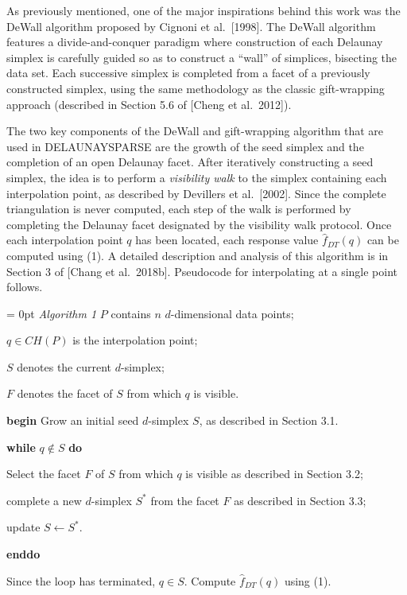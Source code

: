 As previously mentioned, one of the major inspirations behind this
work was the DeWall algorithm proposed by Cignoni et al.\ [1998].
The DeWall algorithm features a divide-and-conquer paradigm where
construction of each Delaunay simplex is carefully guided so as to
construct a ``wall'' of simplices, bisecting the data set. Each
successive simplex is completed from a facet of a previously constructed
simplex, using the same methodology as the classic gift-wrapping
approach (described in Section 5.6 of [Cheng et al.\ 2012]).

The two key components of the DeWall and gift-wrapping algorithm
that are used in DELAUNAYSPARSE are the growth of the seed simplex
and the completion of an open Delaunay facet. After iteratively
constructing a seed simplex, the idea is to perform a 
{\it visibility walk} to the simplex containing each interpolation
point, as described by Devillers et al.\ [2002]. Since the complete
triangulation is never computed, each step of the walk is performed by
completing the Delaunay facet designated by the visibility walk protocol.
Once each interpolation point $q$ has been located, each response value
${\hat f}_{DT}(q)$ can be computed using (1). A detailed description
and analysis of this algorithm is in Section 3 of [Chang et al.\ 2018b].
Pseudocode for interpolating at a single point follows.

{\parindent =0pt \parskip= 0pt
\smallskip
\leftskip 20pt
{\sl Algorithm 1}
\smallskip
$P$ contains $n$ $d$-dimensional data points;\par
$q \in CH(P)$ is the interpolation point;\par
$S$ denotes the current $d$-simplex; \par
$F$ denotes the facet of $S$ from which $q$ is visible. \par
\smallskip
{\bf begin}
Grow an initial seed $d$-simplex $S$, as described in Section 3.1.\par
{\bf while} $q \not\in S$ {\bf do}\par
\leftskip 40pt
Select the facet $F$ of $S$ from which $q$ is visible as
described in Section 3.2;\par
complete a new $d$-simplex $S^*$ from the facet $F$ as described 
in Section 3.3;\par
update $S \leftarrow S^*$.\par
\leftskip 20pt
{\bf enddo}\par
Since the loop has terminated, $q\in S$.
Compute ${\hat f}_{DT}(q)$ using (1).\par
\smallskip}

